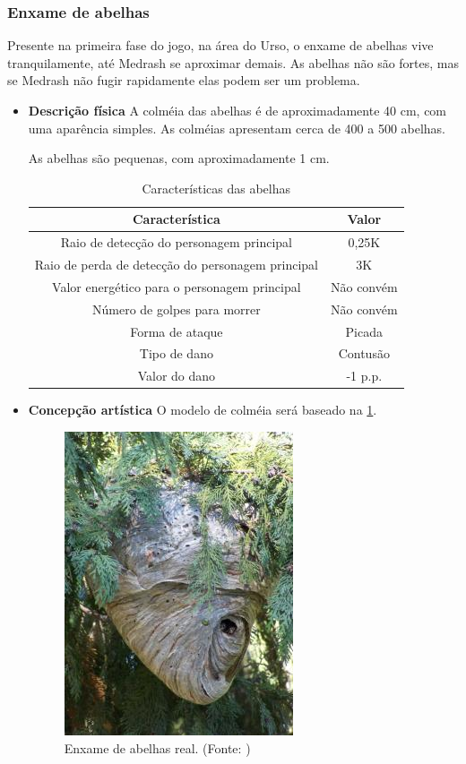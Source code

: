 \subsubsection{Enxame de abelhas}
Presente na primeira fase do jogo, na área do Urso, o enxame de abelhas vive tranquilamente, até Medrash se aproximar demais. As abelhas não são fortes, mas se Medrash não fugir rapidamente elas podem ser um problema.
\begin{itemize}
\item {\bf Descrição física}
A colméia das abelhas é de aproximadamente 40 cm, com uma aparência simples. As colméias apresentam cerca de 400 a 500 abelhas.

As abelhas são pequenas, com aproximadamente 1 cm. 
\begin{table}[H]
\begin{center}
\begin{tabular}{|c|c|}
\hline 
\textbf{Característica} & \textbf{Valor} \\ 
\hline 
Raio de detecção do personagem principal & 0,25K \\ 
\hline 
Raio de perda de detecção do personagem principal & 3K \\ 
\hline 
Valor energético para o personagem principal & Não convém\\ 
\hline 
Número de golpes para morrer & Não convém \\ 
\hline 
Forma de ataque & Picada \\ 
\hline 
Tipo de dano & Contusão \\ 
\hline 
Valor do dano & -1 p.p. \\ 
\hline 
\end{tabular} 
\end{center}
\caption{Características das abelhas}
\label{table:abelhas}
\end{table}
\end{itemize}
\begin{itemize}

\item {\bf Concepção artística}
O modelo de colméia será baseado na \ref{img:abelhas}.

 \begin{figure}[H]
 \centering
 \includegraphics[scale=0.7]{Imagens/enxame01.png}
 \caption{Enxame de abelhas real. (Fonte: \cite{bib:enxame01})}
\label{img:abelhas}
\end{figure}
\end{itemize}
\newpage
